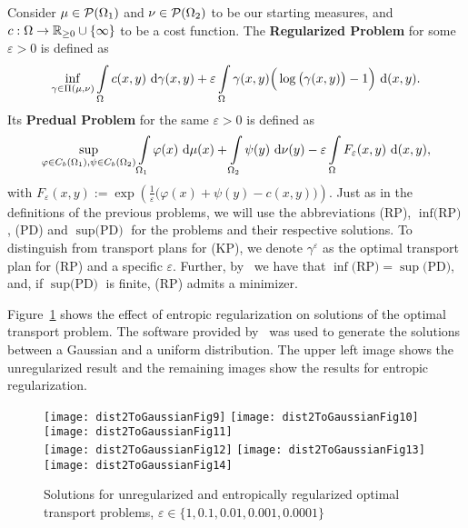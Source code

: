 \begin{definition}\label{RegProbs}
	Consider $\mu \in \PM{\Omega_1}$ and $\nu \in \PM{\Omega_2}$ to be our starting measures, and $\map[c]{\Omega}{\RZero \cup \{ \infty \}}$ to be a cost function. The \textbf{Regularized Problem} for some $\varepsilon > 0$ is defined as
	\[ \inf\limits_{\gamma \in \TP{\mu}{\nu}} \int\limits_\Omega c(x, y)~\Dx[x, y]{\gamma} + \varepsilon \int\limits_\Omega \gamma(x, y) \Big( \log\big( \gamma(x, y) \big) - 1 \Big)~\Dx[x, y]{}. \]
	Its \textbf{Predual Problem} for the same $\varepsilon > 0$ is defined as
	\[ \sup\limits_{\varphi \in \CF[b]{\Omega_1}, \psi \in \CF[b]{\Omega_2}} \int\limits_{\Omega_1} \varphi(x)~\Dx{\mu} + \int\limits_{\Omega_2} \psi(y)~\Dx[y]{\nu} - \varepsilon \int\limits_\Omega F_{\varepsilon}(x, y)~\Dx[x, y]{}, \]
	with $F_{\varepsilon}(x, y) := \exp\left( \frac{1}{\varepsilon} \big( \varphi(x) + \psi(y) - c(x, y) \big) \right)$.
	Just as in the definitions of the previous problems, we will use the abbreviations (RP), $\inf \text{(RP)}$, (PD) and $\sup \text{(PD)}$ for the problems and their respective solutions. To distinguish from transport plans for (KP), we denote $\gamma^{\varepsilon}$ as the optimal transport plan for (RP) and a specific $\varepsilon$. Further, by\ \cite[Proposition~3.1]{Cla2021} we have that $\inf \text{(RP)} = \sup \text{(PD)}$, and, if $\sup \text{(PD)}$ is finite, (RP) admits a minimizer.
\end{definition}

\begin{remark}
	Figure~\ref{RegImages} shows the effect of entropic regularization on solutions of the optimal transport problem. The software provided by\ \cite{PythonOT} was used to generate the solutions between a Gaussian and a uniform distribution. The upper left image shows the unregularized result and the remaining images show the results for entropic regularization.

	\begin{figure}
		\texttt{[image: dist2ToGaussianFig9]}\hfill
		\texttt{[image: dist2ToGaussianFig10]}\hfill
		\texttt{[image: dist2ToGaussianFig11]} \\
		\texttt{[image: dist2ToGaussianFig12]}\hfill
		\texttt{[image: dist2ToGaussianFig13]}\hfill
		\texttt{[image: dist2ToGaussianFig14]}\hfill
		\caption{Solutions for unregularized and entropically regularized optimal transport problems, $\varepsilon \in \{ 1, 0.1, 0.	01, 0.001, 0.0001 \}$}\label{RegImages}
	\end{figure}
\end{remark}

